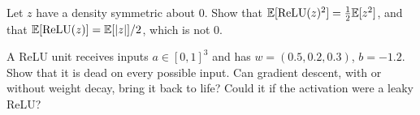 \begin{notechapter}
\begin{exercise}\label{activation-functions:exr:4}
Let $z$ have a density symmetric about $0$. Show that $\mathbb{E}[\mathrm{ReLU}(z)^2] = \frac12\mathbb{E}[z^2]$, and that
$\mathbb{E}[\mathrm{ReLU}(z)] = \mathbb{E}[\left|z\right|]/2$, which is not $0$.
\end{exercise}

\begin{exercise}\label{activation-functions:exr:5}
A ReLU unit receives inputs $a\in[0,1]^3$ and has $w = (0.5, 0.2, 0.3)$, $b = -1.2$. Show that it is dead on
every possible input. Can gradient descent, with or without weight decay, bring it back to
life? Could it if the activation were a leaky ReLU?
\end{exercise}
\end{notechapter}
